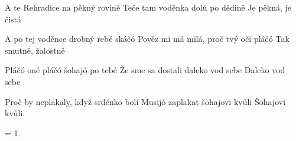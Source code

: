 
\beginverse{}
A te Rehradice na pěkný rovině
Teče tam voděnka dolů po dědině
Je pěkná, je čistá
\endverse{}

\beginverse{}
A po tej voděnce drobný rebé skáčó
Pověz mi má milá, proč tvý oči pláčó
Tak smutně, žalostně
\endverse{}

\beginverse{}
Pláčó oné pláčó šohajó po tebé
Že sme sa dostali daleko vod sebe
Daleko vod sebe
\endverse{}

\beginverse{}
Proč by neplakaly, když srdénko bolí
Musijó zaplakat šohajovi kvůli
Šohajovi kvůli.
\endverse{}

\beginverse{}
= 1.
\endverse{}

\endsong{}
